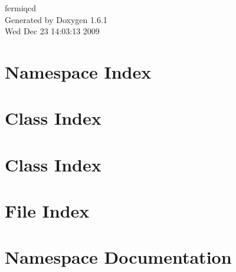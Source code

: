 \documentclass[a4paper]{book}
\begin{document}
\hypersetup{pageanchor=false}
\begin{titlepage}
\vspace*{7cm}
\begin{center}
{\Large fermiqcd }\\
\vspace*{1cm}
{\large Generated by Doxygen 1.6.1}\\
\vspace*{0.5cm}
{\small Wed Dec 23 14:03:13 2009}\\
\end{center}
\end{titlepage}
\clearemptydoublepage
{}
\tableofcontents
\clearemptydoublepage
{}
\hypersetup{pageanchor=true}
\chapter{Namespace Index}

\chapter{Class Index}

\chapter{Class Index}

\chapter{File Index}

\chapter{Namespace Documentation}



\end{document}
